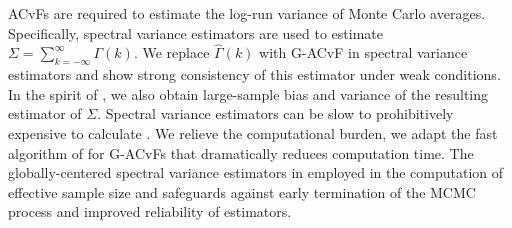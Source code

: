 \documentclass[11pt]{article}
\newcommand{\X}{\mathcal{X}}
\theoremstyle{remark}
\begin{document}
 
ACvFs are required to estimate the log-run variance of Monte Carlo averages. Specifically, spectral variance estimators are used to estimate $\Sigma = \sum_{k=-\infty}^{\infty} \Gamma(k)$. We replace $\hat{\Gamma}(k)$ with G-ACvF in spectral variance estimators and show strong consistency of this estimator under weak conditions. In the spirit of \cite{andr:1991}, we also obtain large-sample bias and variance of the resulting estimator of $\Sigma$. Spectral variance estimators can be slow to prohibitively expensive to calculate \citep{liu:fleg:2018}. We relieve the computational burden, we adapt the fast algorithm of \cite{heberle2017fast} for G-ACvFs that dramatically reduces computation time. The globally-centered spectral variance estimators in employed in the computation of effective sample size and safeguards against early termination of the MCMC process and improved reliability of estimators.


\end{document}
